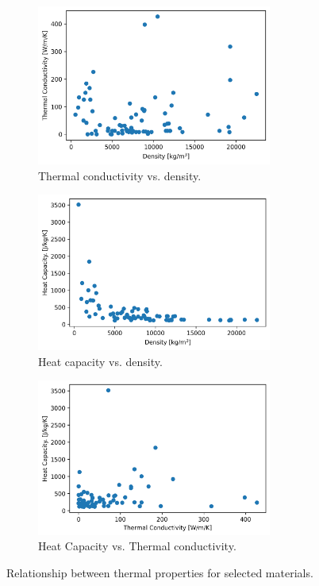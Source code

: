 \begin{figure}[htbp!] %
  \centering
  \begin{subfigure}[b]{0.49\textwidth}
    \centering
    \includegraphics[width=0.85\textwidth]{figures/rho_k}
    \caption{Thermal conductivity vs. density.}
  \end{subfigure}
  \hfill
  \begin{subfigure}[b]{0.49\textwidth}
    \centering
    \includegraphics[width=0.85\textwidth]{figures/rho_cp}
    \caption{Heat capacity vs. density.}
  \end{subfigure}
  \par
  \begin{subfigure}[b]{0.49\textwidth}
    \centering
    \includegraphics[width=0.85\textwidth]{figures/k_cp}
    \caption{Heat Capacity vs. Thermal conductivity.}
  \end{subfigure}
  \caption{Relationship between thermal properties for selected materials.}
  \label{fig:pre-syn-mats}
\end{figure}


